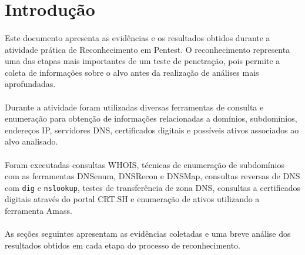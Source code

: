\section{Introdução}

\paragraph{}
Este documento apresenta as evidências e os resultados obtidos durante a
atividade prática de Reconhecimento em Pentest. O reconhecimento representa
uma das etapas mais importantes de um teste de penetração, pois permite a
coleta de informações sobre o alvo antes da realização de análises mais
aprofundadas.

\paragraph{}
Durante a atividade foram utilizadas diversas ferramentas de consulta e
enumeração para obtenção de informações relacionadas a domínios,
subdomínios, endereços IP, servidores DNS, certificados digitais e possíveis
ativos associados ao alvo analisado.

\paragraph{}
Foram executadas consultas WHOIS, técnicas de enumeração de subdomínios com
as ferramentas DNSenum, DNSRecon e DNSMap, consultas reversas de DNS com
\texttt{dig} e \texttt{nslookup}, testes de transferência de zona DNS,
consultas a certificados digitais através do portal CRT.SH e enumeração de
ativos utilizando a ferramenta Amass.

\paragraph{}
As seções seguintes apresentam as evidências coletadas e uma breve análise
dos resultados obtidos em cada etapa do processo de reconhecimento.
